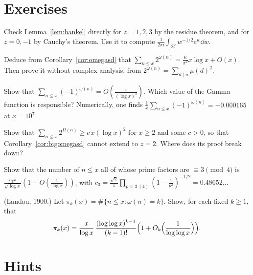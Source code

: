 \section{Exercises}

\begin{exercise}[$\star$]\label{ex:hankelint}
Check Lemma~\ref{lem:hankel} directly for $z=1,2,3$ by the residue theorem, and for $z=0,-1$ by Cauchy's theorem. Use it to compute $\frac1{2\pi i}\int_{\mathcal H}w^{-1/2}e^w\dd w$.
\end{exercise}

\begin{exercise}[$\star$]\label{ex:twoomega}
Deduce from Corollary~\ref{cor:omegasd} that $\sum_{n\le x}2^{\omega(n)}=\frac6{\pi^2}x\log x+O(x)$. Then prove it without complex analysis, from $2^{\omega(n)}=\sum_{d\mid n}\mu(d)^2$.
\end{exercise}

\begin{exercise}[$\star\star$]\label{ex:minusone}
Show that $\sum_{n\le x}(-1)^{\omega(n)}=O(\frac x{(\log x)^3})$. Which value of the Gamma function is responsible? Numerically, one finds $\frac1x\sum_{n\le x}(-1)^{\omega(n)}=-0.000165$ at $x=10^7$.
\end{exercise}

\begin{exercise}[$\star\star$]\label{ex:bigomegasd}
Show that $\sum_{n\le x}2^{\Omega(n)}\ge c\,x(\log x)^2$ for $x\ge2$ and some $c>0$, so that Corollary~\ref{cor:bigomegasd} cannot extend to $z=2$. Where does its proof break down?
\end{exercise}

\begin{exercise}[$\star\star$]\label{ex:onlythree}
Show that the number of $n\le x$ all of whose prime factors are $\equiv3\pmod4$ is $\frac{c_3x}{\sqrt{\log x}}(1+O(\frac1{\log x}))$, with $c_3=\frac{\sqrt2}\pi\prod_{p\equiv3\ (4)}(1-\frac1{p^2})^{-1/2}=0.48652\ldots$
\end{exercise}

\begin{exercise}[$\star\star\star$]\label{ex:landaupik}
(Landau, 1900.) Let $\pi_k(x)=\#\{n\le x:\omega(n)=k\}$. Show, for each fixed $k\ge1$, that
\[
\pi_k(x)=\frac x{\log x}\,\frac{(\log\log x)^{k-1}}{(k-1)!}\Bigl(1+O_k\Bigl(\frac1{\log\log x}\Bigr)\Bigr).
\]
\end{exercise}

\section{Hints}

